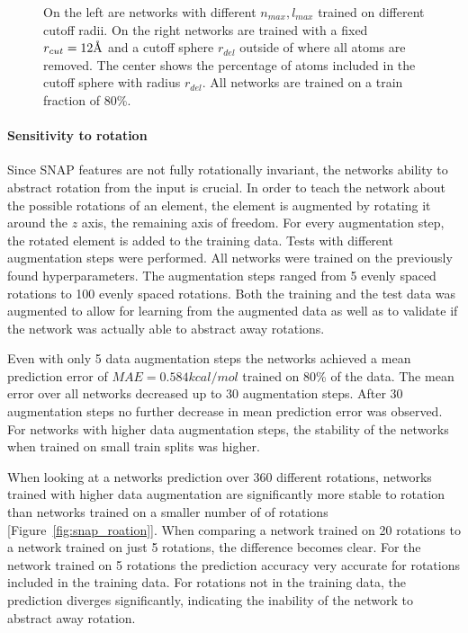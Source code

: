 \begin{figure}[!htb]
  \endminipage\hfill
  \caption[Comparison of SNAP cutoff radii]{
  On the left are networks with different $n_{max}, l_{max}$ trained on different cutoff radii.
  On the right networks are trained with a fixed $r_{cut} = 12 \AA$ and a cutoff sphere $r_{del}$ outside of where all atoms are removed.
  The center shows the percentage of atoms included in the cutoff sphere with radius $r_{del}$.
  All networks are trained on a train fraction of 80\%.
 }
  \label{fig:snap_hyperparameter}
\end{figure}


\paragraph{Sensitivity to rotation}
Since SNAP features are not fully rotationally invariant, the networks ability to abstract rotation from the input is crucial.
In order to teach the network about the possible rotations of an element, 
the element is augmented by rotating it around the $z$ axis, the remaining axis of freedom.
For every augmentation step, the rotated element is added to the training data.
Tests with different augmentation steps were performed.
All networks were trained on the previously found hyperparameters.
The augmentation steps ranged from 5 evenly spaced rotations to 100 evenly spaced rotations.
Both the training and the test data was augmented to allow for learning from the augmented data
as well as to validate if the network was actually able to abstract away rotations.

Even with only 5 data augmentation steps the networks achieved a mean prediction error of $MAE = 0.584 kcal/mol$ trained on 80\% of the data.
The mean error over all networks decreased up to 30 augmentation steps.
After 30 augmentation steps no further decrease in mean prediction error was observed.
For networks with higher data augmentation steps, the stability of the networks when trained on small train splits was higher.

When looking at a networks prediction over 360 different rotations, networks trained with higher data augmentation 
are significantly more stable to rotation than networks trained on a smaller number of of rotations [Figure~\ref{fig:snap_roation}].
When comparing a network trained on 20 rotations to a network trained on just 5 rotations,
the difference becomes clear.
For the network trained on 5 rotations the prediction accuracy very accurate for rotations included in the training data.
For rotations not in the training data, the prediction diverges significantly, indicating the inability of the network to abstract away rotation.

